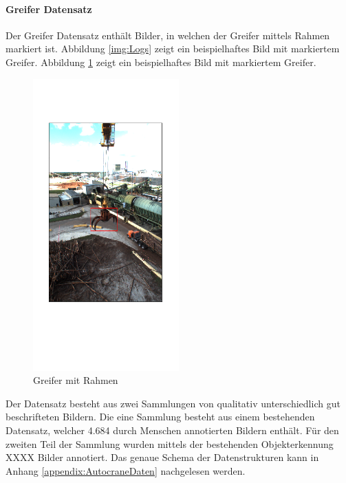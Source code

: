 		\paragraph{Greifer Datensatz} Der Greifer Datensatz enthält Bilder, in welchen der Greifer mittels Rahmen markiert ist. Abbildung \ref{img:Logs}  zeigt ein beispielhaftes Bild mit markiertem Greifer. Abbildung \ref{img:Grapple} zeigt ein beispielhaftes Bild mit markiertem Greifer.
		\begin{figure}[h]
				\centering
				\includegraphics[width=0.5\textwidth, center]{bilder/Grundlagen/Grapple_8.png}
				\caption[Bsp. Bild: Greifer mit Rahmen]{Greifer mit Rahmen}
				\label{img:Grapple}
		\end{figure}
		Der Datensatz besteht aus zwei Sammlungen von qualitativ unterschiedlich gut beschrifteten Bildern. Die eine Sammlung besteht aus einem bestehenden Datensatz, welcher 4.684 durch Menschen annotierten Bildern enthält. Für den zweiten Teil der Sammlung wurden mittels der  bestehenden Objekterkennung XXXX Bilder annotiert.  Das genaue Schema der Datenstrukturen kann in Anhang \ref{appendix:AutocraneDaten} nachgelesen werden.

